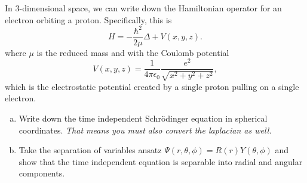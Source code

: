 \documentclass[12pt]{article} %
\begin{document}
\newpage
\begin{problem}
In 3-dimensional space, we can write down the Hamiltonian operator for an electron orbiting a proton. Specifically, this is
\[
H = -\frac{\hbar^2}{2\mu} \Delta + V(x,y,z).
\]
where $\mu$ is the reduced mass and with the Coulomb potential
    \[
    V(x,y,z) = \frac{1}{4\pi \epsilon_0} \frac{e^2}{\sqrt{x^2+y^2+z^2}},
    \]
which is the electrostatic potential created by a single proton pulling on a single electron. 
\begin{enumerate}[(a)]
    \item Write down the time independent Schr\"odinger equation in spherical coordinates. \emph{That means you must also convert the laplacian as well.}
    \item Take the separation of variables ansatz $\Psi(r,\theta,\phi) = R(r)Y(\theta,\phi)$ and show that the time independent equation is separable into radial and angular components.
\end{enumerate}
\end{problem}
\end{document}
